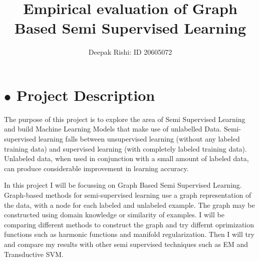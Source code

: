 \documentclass[]{article}
\title{Empirical evaluation of Graph Based Semi Supervised Learning}
\date{}
\begin{document}
\nocite{*}
\author{Deepak Rishi: ID 20605072}
\maketitle
\vspace{-60.6pt}

\section*{$\bullet$ Project Description}
The purpose of this project is to explore the area of Semi Supervised Learning and build Machine Learning Models that make use of unlabelled Data.
Semi-supervised learning falls between unsupervised learning (without any labeled training data) and supervised learning (with completely labeled training data). Unlabeled data, when used in conjunction with a small amount of labeled data, can produce considerable improvement in learning accuracy.

In this project I will be focussing on Graph Based Semi Supervised Learning.
Graph-based methods for semi-supervised learning use a graph representation of the data, with a node for each labeled and unlabeled example. The graph may be constructed using domain knowledge or similarity of examples. I will be comparing different methods to construct the graph and try differnt oprimization functions such as harmonic functions and manifold regularization. Then I will try and compare my results with other semi supervised techniques such as EM and  Transductive SVM.




\end{document}
